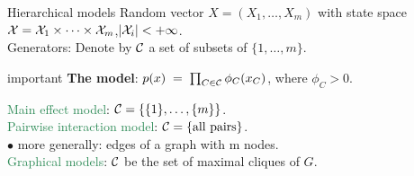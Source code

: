 \documentclass[11pt,handout,aspectratio=169,dvipsnames]{beamer}
\begin{document}
\begin{frame}{Hierarchical models}
Random vector $X=(X_1,\ldots,X_m)$ with state space ${\cal X}={\cal X}_1\times \cdots\times {\cal X}_m$,\quad  $|{\cal X}_i|<+\infty$.\\[.3cm]
	\alert{Generators}: Denote by ${\cal C}$ a set of subsets of $\{1,\ldots,m\}$.\\[.4cm]
	

	\begin{beamercolorbox}[wd=\paperwidth,sep=3pt]{important}
		\textbf{The model}: $p(x)\;=\;\prod_{C\in {\cal C}} \phi_C(x_C)$, \;\;where $\phi_C>0$.
	\end{beamercolorbox}
	\bigskip
	
	\textcolor{SeaGreen}{Main effect model}: ${\cal C}=\{\{1\},\ldots,\{m\}\}$.\\[.3cm]
	\textcolor{SeaGreen}{Pairwise interaction model}: ${\cal C}=\{\mbox{all pairs}\}$.\\
	\qquad $\bullet$ more generally: edges of a graph with m nodes.\\[.3cm]
		\textcolor{SeaGreen}{Graphical models}: ${\cal C}$ be the set of maximal cliques of $G$.\\[.3cm]
\end{frame}

%
%		
\end{document}
